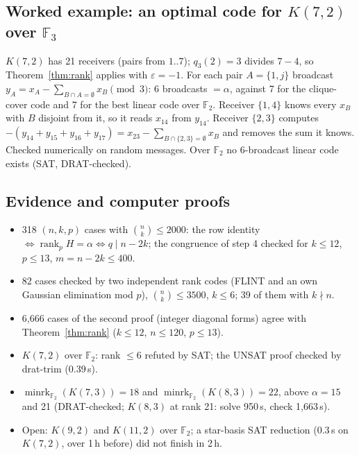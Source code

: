 \subsection{Worked example: an optimal code for $K(7,2)$ over $\mathbb{F}_3$}
$K(7,2)$ has 21 receivers (pairs from $1..7$); $q_3(2)=3$ divides $7-4$, so Theorem~\ref{thm:rank} applies with
$\varepsilon=-1$. For each pair $A=\{1,j\}$ broadcast $y_A=x_A-\sum_{B\cap A=\emptyset}x_B\pmod3$: 6 broadcasts $=\alpha$,
against 7 for the clique-cover code and 7 for the best linear code over $\mathbb{F}_2$. Receiver $\{1,4\}$ knows every
$x_B$ with $B$ disjoint from it, so it reads $x_{14}$ from $y_{14}$. Receiver $\{2,3\}$ computes
$-(y_{14}+y_{15}+y_{16}+y_{17})=x_{23}-\sum_{B\cap\{2,3\}=\emptyset}x_B$ and removes the sum it knows. Checked
numerically on random messages. Over $\mathbb{F}_2$ no 6-broadcast linear code exists (SAT, DRAT-checked).

\subsection{Evidence and computer proofs}
\begin{itemize}
  \item 318 $(n,k,p)$ cases with $\binom nk\le2000$: the row identity $\iff\operatorname{rank}_pH=\alpha\iff q\mid
  n-2k$; the congruence of step 4 checked for $k\le12$, $p\le13$, $m=n-2k\le400$.
  \item 82 cases checked by two independent rank codes (FLINT and an own Gaussian elimination mod $p$),
  $\binom nk\le3500$, $k\le6$; 39 of them with $k\nmid n$.
  \item 6{,}666 cases of the second proof (integer diagonal forms) agree with Theorem~\ref{thm:rank} ($k\le12$,
  $n\le120$, $p\le13$).
  \item $K(7,2)$ over $\mathbb{F}_2$: rank $\le6$ refuted by SAT; the UNSAT proof checked by drat-trim (0.39\,s).
  \item $\operatorname{minrk}_{\mathbb{F}_2}(K(7,3))=18$ and $\operatorname{minrk}_{\mathbb{F}_2}(K(8,3))=22$, above
  $\alpha=15$ and 21 (DRAT-checked; $K(8,3)$ at rank 21: solve 950\,s, check 1{,}663\,s).
  \item Open: $K(9,2)$ and $K(11,2)$ over $\mathbb{F}_2$; a star-basis SAT reduction (0.3\,s on $K(7,2)$, over 1\,h
  before) did not finish in 2\,h.
\end{itemize}

